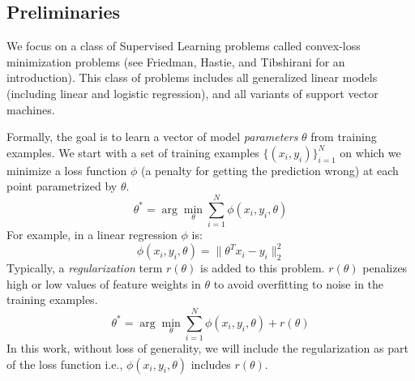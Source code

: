 \subsection{Preliminaries}

We focus on a class of Supervised Learning problems called convex-loss minimization problems (see Friedman, Hastie, and Tibshirani \cite{friedman2001elements} for an introduction).
This class of problems includes all generalized linear models (including linear and logistic regression), and all variants of support vector machines.

Formally, the goal is to learn a vector of model \emph{parameters} $\theta$ from training examples.
We start with a set of training examples $\{(x_{i},y_{i})\}_{i=1}^{N}$
on which we minimize a loss function $\phi$ (a penalty for getting the prediction wrong) at each point parametrized by $\theta$.
\[
 \theta^{*}=\arg\min_{\theta}\sum_{i=1}^{N}\phi(x_{i},y_{i},\theta)
\]
For example, in a linear regression $\phi$ is:
\[
\phi(x_{i},y_{i},\theta) = \|\theta^Tx_{i} - y_i \|_2^2
\]
Typically, a \emph{regularization} term $r(\theta)$ is added to this problem.
$r(\theta)$ penalizes high or low values of feature weights in $\theta$ to avoid overfitting to noise in the training examples.
\[
 \theta^{*}=\arg\min_{\theta}\sum_{i=1}^{N}\phi(x_{i},y_{i},\theta) + r(\theta)
\]
In this work, without loss of generality, we will include the regularization as part of the loss function i.e., $\phi(x_{i},y_{i},\theta)$ includes $r(\theta)$.

